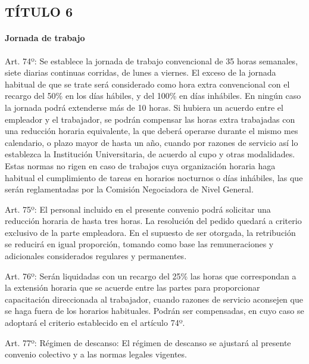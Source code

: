 \documentclass[]{article}
\let\oldparagraph\paragraph
\renewcommand{\paragraph}[1]{\oldparagraph{#1}\mbox{}}
\begin{document}
\subsection{TÍTULO 6}\label{tuxedtulo-6}


\paragraph{Jornada de trabajo}\label{jornada-de-trabajo}

Art. 74º: Se establece la jornada de trabajo convencional de 35 horas
semanales, siete diarias continuas corridas, de lunes a viernes. El
exceso de la jornada habitual de que se trate será considerado como hora
extra convencional con el recargo del 50\% en los días hábiles, y del
100\% en días inhábiles. En ningún caso la jornada podrá extenderse más
de 10 horas. Si hubiera un acuerdo entre el empleador y el trabajador,
se podrán compensar las horas extra trabajadas con una reducción horaria
equivalente, la que deberá operarse durante el mismo mes calendario, o
plazo mayor de hasta un año, cuando por razones de servicio así lo
establezca la Institución Universitaria, de acuerdo al cupo y otras
modalidades. Estas normas no rigen en caso de trabajos cuya organización
horaria haga habitual el cumplimiento de tareas en horarios nocturnos o
días inhábiles, las que serán reglamentadas por la Comisión Negociadora
de Nivel General.

Art. 75º: El personal incluido en el presente convenio podrá solicitar
una reducción horaria de hasta tres horas. La resolución del pedido
quedará a criterio exclusivo de la parte empleadora. En el supuesto de
ser otorgada, la retribución se reducirá en igual proporción, tomando
como base las remuneraciones y adicionales considerados regulares y
permanentes.

Art. 76º: Serán liquidadas con un recargo del 25\% las horas que
correspondan a la extensión horaria que se acuerde entre las partes para
proporcionar capacitación direccionada al trabajador, cuando razones de
servicio aconsejen que se haga fuera de los horarios habituales. Podrán
ser compensadas, en cuyo caso se adoptará el criterio establecido en el
artículo 74º.

Art. 77º: Régimen de descanso: El régimen de descanso se ajustará al
presente convenio colectivo y a las normas legales vigentes.
\end{document}
